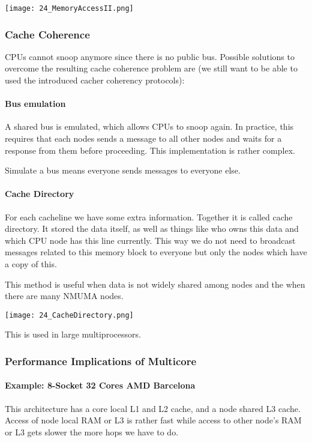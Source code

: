 \texttt{[image: 24\_MemoryAccessII.png]}

\subsubsection{Cache Coherence}
CPUs cannot snoop anymore since there is no public bus. Possible solutions to overcome the resulting cache coherence problem are (we still want to be able to used the introduced cacher coherency protocols):

\paragraph{Bus emulation}
A shared bus is emulated, which allows CPUs to snoop again. In practice, this requires that each nodes sends a message to all other nodes and waits for a response from them before proceeding. This implementation is rather complex.

Simulate a bus means everyone sends messages to everyone else. 

\paragraph{Cache Directory}
For each cacheline we have some extra information. Together it is called cache directory. It stored the data itself, as well as things like who owns this data and which CPU node has this line currently. This way we do not need to broadcast messages related to this memory block to everyone but only the nodes which have a copy of this.

This method is useful when data is not widely shared among nodes and the when there are many NMUMA nodes. 

\texttt{[image: 24\_CacheDirectory.png]}

This is used in large multiprocessors.

\subsubsection{Performance Implications of Multicore}

\paragraph{Example: 8-Socket 32 Cores AMD Barcelona}
This architecture has a core local L1 and L2 cache, and a node shared L3 cache. Access of node local RAM or L3 is rather fast while access to other node's RAM or L3 gets slower the more hops we have to do. 

